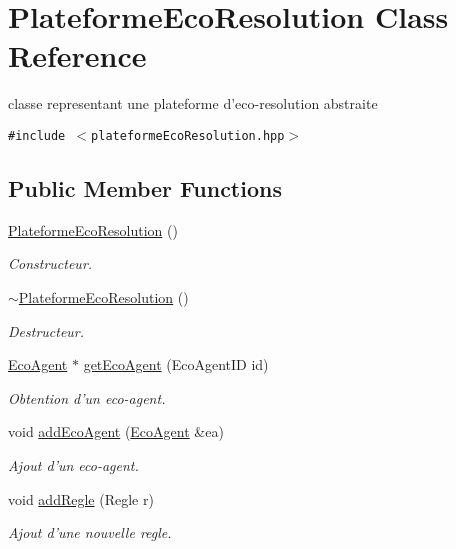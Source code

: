 \hypertarget{classPlateformeEcoResolution}{
\section{PlateformeEcoResolution Class Reference}
\label{classPlateformeEcoResolution}
}
classe representant une plateforme d'eco-resolution abstraite  


{\tt \#include $<$plateformeEcoResolution.hpp$>$}

\subsection*{Public Member Functions}
\begin{CompactItemize}
\item 
\hyperlink{classPlateformeEcoResolution_6e03cc2c6a51bc4a47d2d226e41d13e9}{PlateformeEcoResolution} ()
\begin{CompactList}\small\item\em Constructeur. \item\end{CompactList}\item 
\hyperlink{classPlateformeEcoResolution_356b4862f53c4be870304e5186601b5a}{$\sim$PlateformeEcoResolution} ()
\begin{CompactList}\small\item\em Destructeur. \item\end{CompactList}\item 
\hyperlink{classEcoAgent}{EcoAgent} $\ast$ \hyperlink{classPlateformeEcoResolution_266366888012385cb02dbff244ed320e}{getEcoAgent} (EcoAgentID id)
\begin{CompactList}\small\item\em Obtention d'un eco-agent. \item\end{CompactList}\item 
void \hyperlink{classPlateformeEcoResolution_6fdb4c8ecc62252da4326d9763d4f28d}{addEcoAgent} (\hyperlink{classEcoAgent}{EcoAgent} \&ea)
\begin{CompactList}\small\item\em Ajout d'un eco-agent. \item\end{CompactList}\item 
void \hyperlink{classPlateformeEcoResolution_8a36263f2e16fa04ace79d7eab917d01}{addRegle} (Regle r)
\begin{CompactList}\small\item\em Ajout d'une nouvelle regle. \item\end{CompactList}\item 

\end{CompactItemize}
